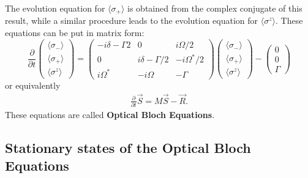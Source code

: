 The evolution equation for $\langle \sigma_+ \rangle$ is obtained from the complex conjugate of this result, while a similar procedure leads to the evolution equation for $\langle \sigma^z \rangle$. These equations can be put in matrix form: 
\begin{equation}
    \frac{\partial}{\partial t}
    \begin{pmatrix}
        \langle \sigma_- \rangle \\ \langle \sigma_+ \rangle \\ \langle \sigma^z \rangle
    \end{pmatrix} = 
    \begin{pmatrix}
        -i\delta -{\Gamma}{2} & 0 & {i\Omega}/{2} \\
        0 & i\delta -{\Gamma}/{2} & -{i\Omega^*}/{2} \\
        i \Omega^* & -i \Omega & -\Gamma 
    \end{pmatrix}
    \begin{pmatrix}
        \langle \sigma_- \rangle \\ \langle \sigma_+ \rangle \\ \langle \sigma^z \rangle
    \end{pmatrix} - \begin{pmatrix}
        0 \\ 0 \\ \Gamma
    \end{pmatrix}
\end{equation}
or equivalently 
\begin{align}
    \frac{\partial}{\partial t} \vec{S} = M \vec{S} - \vec{R}. 
\end{align}
These equations are called \textbf{Optical Bloch Equations}.

\subsection{Stationary states of the Optical Bloch Equations}

